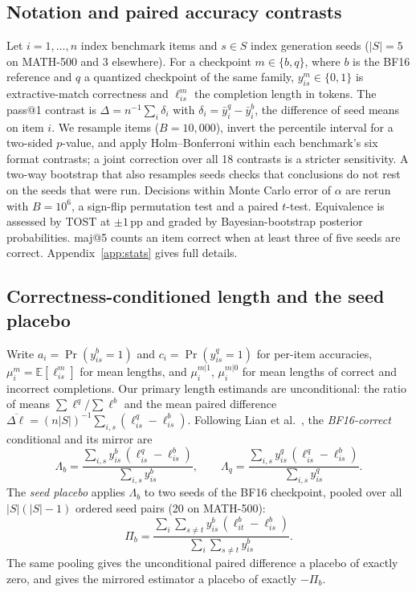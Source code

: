 \documentclass[11pt,a4paper]{article}
\begin{document}
\subsection{Notation and paired accuracy contrasts}
Let $i=1,\dots,n$ index benchmark items and $s\in S$ index generation seeds ($|S|=5$ on MATH-500 and $3$ elsewhere). For a checkpoint $m\in\{b,q\}$, where $b$ is the BF16 reference and $q$ a quantized checkpoint of the same family, $y^m_{is}\in\{0,1\}$ is extractive-match correctness and $\ell^m_{is}$ the completion length in tokens. The pass@1 contrast is $\Delta=n^{-1}\sum_i\delta_i$ with $\delta_i=\bar y^{q}_{i}-\bar y^{b}_{i}$, the difference of seed means on item $i$. We resample items ($B=10{,}000$), invert the percentile interval for a two-sided $p$-value, and apply Holm--Bonferroni within each benchmark's six format contrasts; a joint correction over all 18 contrasts is a stricter sensitivity. A two-way bootstrap that also resamples seeds checks that conclusions do not rest on the seeds that were run. Decisions within Monte Carlo error of $\alpha$ are rerun with $B=10^6$, a sign-flip permutation test and a paired $t$-test. Equivalence is assessed by TOST at $\pm1$\,pp and graded by Bayesian-bootstrap posterior probabilities. maj@5 counts an item correct when at least three of five seeds are correct. Appendix~\ref{app:stats} gives full details.

\subsection{Correctness-conditioned length and the seed placebo}
\label{sec:placebo-def}
Write $a_i=\Pr(y^b_{is}=1)$ and $c_i=\Pr(y^q_{is}=1)$ for per-item accuracies, $\mu^m_i=\mathbb{E}[\ell^m_{is}]$ for mean lengths, and $\mu^{m|1}_i$, $\mu^{m|0}_i$ for mean lengths of correct and incorrect completions. Our primary length estimands are unconditional: the ratio of means $\sum\ell^q/\sum\ell^b$ and the mean paired difference $\overline{\Delta\ell}=(n|S|)^{-1}\sum_{i,s}(\ell^q_{is}-\ell^b_{is})$. Following Lian et al.~\cite{lian2026quantinflates}, the \emph{BF16-correct} conditional and its mirror are
\begin{equation}
\Lambda_b=\frac{\sum_{i,s} y^b_{is}\,(\ell^q_{is}-\ell^b_{is})}{\sum_{i,s} y^b_{is}},\qquad
\Lambda_q=\frac{\sum_{i,s} y^q_{is}\,(\ell^q_{is}-\ell^b_{is})}{\sum_{i,s} y^q_{is}}.
\end{equation}
The \emph{seed placebo} applies $\Lambda_b$ to two seeds of the BF16 checkpoint, pooled over all $|S|(|S|-1)$ ordered seed pairs (20 on MATH-500):
\begin{equation}
\Pi_b=\frac{\sum_{i}\sum_{s\neq t} y^b_{is}\,(\ell^b_{it}-\ell^b_{is})}{\sum_{i}\sum_{s\neq t} y^b_{is}}.
\end{equation}
The same pooling gives the unconditional paired difference a placebo of exactly zero, and gives the mirrored estimator a placebo of exactly $-\Pi_b$.
\end{document}
